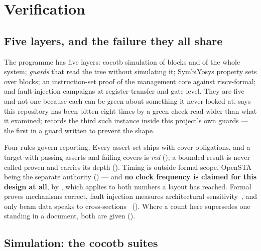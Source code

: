 
\chapter{Verification}
\label{ch:verif}

\section{Five layers, and the failure they all share}
\label{sec:verif-shape}

The programme has five layers: cocotb simulation of blocks and of the whole system; \emph{guards} that read the tree without simulating it; SymbiYosys property sets over blocks; an instruction-set proof of the management core against riscv-formal; and fault-injection campaigns at register-transfer and gate level. They are five and not one because each can be green about something it never looked at.
 says this repository has been bitten eight times
by a green check read wider than what it examined;  records the third such instance inside this project's own guards
--- the first in a guard written to prevent the shape.

Four rules govern reporting. Every assert set ships with cover obligations, and a target with passing asserts and failing covers is \emph{red} (); a bounded result is never called proven and carries its depth (). Timing is
outside formal scope, OpenSTA being the separate authority
() --- and \textbf{no clock frequency is claimed
for this design at all}, by , which
 applies to both numbers a layout has reached.
Formal proves mechanisms correct, fault injection measures architectural sensitivity~\cite{mukherjee2003}, and only beam data speaks to cross-sections~\cite{ecss60_15c} (). Where a count here supersedes one standing in a document, both are given ().

\section{Simulation: the cocotb suites}
\label{sec:verif-cocotb}

